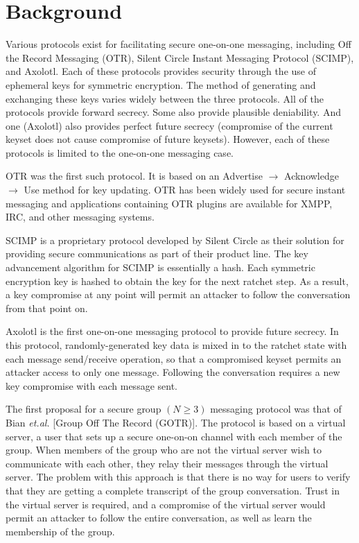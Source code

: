\documentclass[%
preprint,
amsmath,amssymb,
aps,
prb,
floatfix,
]{revtex4-1}
\begin{document}
\section{\label{sec:background}Background}
Various protocols exist for facilitating secure one-on-one messaging, including
Off the Record Messaging (OTR)\cite{ref:otr1,ref:raimondo,ref:otr2,ref:otr3,ref:otr}, Silent Circle Instant Messaging Protocol
(SCIMP)\cite{ref:scimp}, and Axolotl\cite{ref:axolotl}. Each of these protocols
provides security through the use of ephemeral keys for symmetric encryption.
The method of generating and exchanging these keys varies widely between the
three protocols. All of the protocols provide forward
secrecy. Some also provide plausible deniability. And one (Axolotl) also
provides perfect future secrecy (compromise of the current keyset does not cause
compromise of future keysets). However, each of these protocols is limited to
the one-on-one messaging case.

OTR was the first such protocol. It is based on an Advertise $\rightarrow$
Acknowledge $\rightarrow$ Use method for key updating. OTR has been widely used
for secure instant messaging and applications containing OTR plugins are
available for XMPP, IRC, and other messaging systems.

SCIMP is a proprietary protocol developed by Silent Circle as their solution for
providing secure communications as part of their product line. The key
advancement algorithm for SCIMP is essentially a hash. Each symmetric encryption
key is hashed to obtain the key for the next ratchet step. As a result, a key
compromise at any point will permit an attacker to follow the conversation from
that point on.

Axolotl is the first one-on-one messaging protocol to provide future secrecy. In
this protocol, randomly-generated key data is mixed in to the ratchet state with
each message send/receive operation, so that a compromised keyset permits an
attacker access to only one message. Following the conversation requires a new
key compromise with each message sent.

The first proposal for a secure group $(N \ge 3)$ messaging protocol was that of
Bian \textit{et.al.}\cite{ref:bian} [Group Off The Record (GOTR)]. The protocol is based on a virtual server,
a user that sets up a secure one-on-on channel with each member of the group.
When members of the group who are not the virtual server wish to communicate
with each other, they relay their messages through the virtual server. The
problem with this approach is that there is no way for users to verify that they
are getting a complete transcript of the group conversation. Trust in the
virtual server is required, and a compromise of the virtual server would permit
an attacker to follow the entire conversation, as well as learn the membership
of the group.
\end{document}
